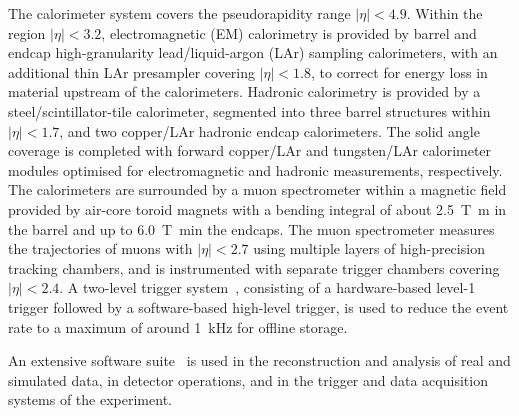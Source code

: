 The calorimeter system covers the pseudorapidity range $|\eta| < 4.9$. Within the region $|\eta|< 3.2$, electromagnetic (EM) calorimetry is provided by barrel and endcap high-granularity lead/liquid-argon (LAr) sampling calorimeters, with an additional thin LAr presampler covering $|\eta| < 1.8$, to correct for energy loss in material upstream of the calorimeters. Hadronic calorimetry is provided by %
a steel/scintillator-tile calorimeter, segmented into three barrel structures within $|\eta| < 1.7$, and two copper/LAr hadronic endcap calorimeters.
The solid angle coverage is completed with forward copper/LAr and tungsten/LAr calorimeter modules optimised for electromagnetic and hadronic measurements, respectively.
The calorimeters are surrounded by a muon spectrometer within a magnetic field provided by air-core toroid magnets with a bending integral of about \SI{2.5}{\tesla\metre} in the barrel and up to \SI{6.0}{\tesla\metre}in the endcaps. 
The muon spectrometer measures the trajectories of muons with $|\eta|<2.7$ using multiple layers of high-precision tracking chambers, and is instrumented with separate trigger chambers covering $|\eta|<2.4$. A two-level trigger system~\cite{Aaboud:2016leb}, consisting of a hardware-based level-1 trigger followed by a software-based high-level trigger, is used to reduce the event rate to a maximum of around \SI{1}{\kHz} for offline storage.

An extensive software suite~\cite{ATL-SOFT-PUB-2021-001} is used in the reconstruction and analysis of real and simulated data, in detector operations, and in the trigger and data acquisition systems of the experiment.
